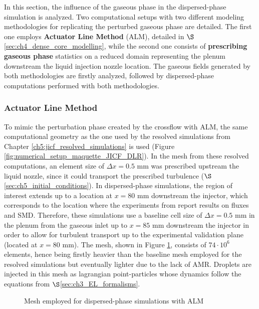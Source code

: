 In this section, the influence of the gaseous phase in the dispersed-phase simulation is analyzed. Two computational setups with two different modeling methodologies for replicating the perturbed gaseous phase are detailed. The first one employs \textbf{Actuator Line Method} (ALM), detailed in $\S$\ref{sec:ch4_dense_core_modelling}, while the second one consists of \textbf{prescribing gaseous phase} statistics on a reduced domain representing the plenum downstream the liquid injection nozzle location. The gaseous fields generated by both methodologies are firstly analyzed, followed by dispersed-phase computations performed with both methodologies.

\clearpage


\subsubsection*{Actuator Line Method}



To mimic the perturbation phase created by the crossflow with ALM, the same computational geometry as the one used by the resolved simulations from Chapter \ref{ch5:jicf_resolved_simulations} is used (Figure \ref{fig:numerical_setup_maquette_JICF_DLR}).    In the mesh from these resolved computations, an element size of $\Delta x = 0.5$ mm was prescribed upstream the liquid nozzle, since it could transport the prescribed turbulence ($\S$\ref{sec:ch5_initial_conditions}). In dispersed-phase simulations, the region of interest extends up to a location at $x = 80$ mm downstream the injector, which corresponds to the location where the experiments from  report results on fluxes and SMD. Therefore, these simulations use a baseline cell size of $\Delta x = 0.5$ mm in the plenum from the gaseous inlet up to $x = 85$ mm downstream the injector in order to allow for turbulent transport up to the experimental validation plane (located at $x = 80$ mm). The mesh, shown in Figure \ref{fig:jicf_dlr_mesh_LGS}, consists of $74 \cdot 10^6$ elements, hence being firstly heavier than the baseline mesh employed for the resolved simulations but eventually lighter due to the lack of AMR. Droplets are injected in this mesh as lagrangian point-particles whose dynamics follow the equations from  $\S$\ref{sec:ch3_EL_formalisms}. %


\begin{figure}[h!]
	\centering	{}
	\vspace*{-0.1in}
	\caption{Mesh employed for dispersed-phase simulations with ALM}
	\label{fig:jicf_dlr_mesh_LGS}
\end{figure}

